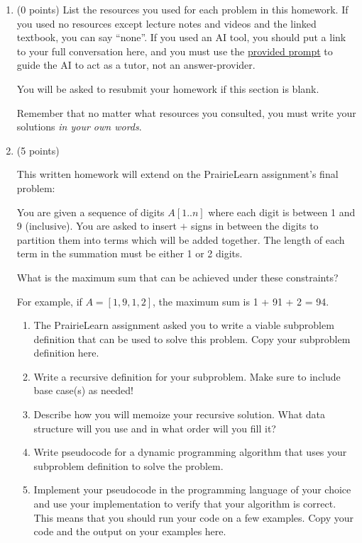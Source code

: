 \documentclass[11pt]{article}
\begin{document}


\begin{enumerate}


\item (0 points) List the resources you used for each problem in this homework. If you used no resources except
lecture notes and videos and the linked textbook, you can say ``none''. If you used
an AI tool, you should put a link to your full conversation here, and you must
use the
\href{https://umaal.org/files/teaching/csci332_fall2026/agents.md}{provided
prompt}
 to guide the AI to act
as a tutor, not an answer-provider.

You will be asked to resubmit your homework if this section is blank.

Remember that no matter what resources you consulted, you must write your solutions
\emph{in your own words}.

\item (5 points)

This written homework will extend on the PrairieLearn assignment's final problem:

You are given a sequence of digits $A[1..n]$ where each digit is between 1 and 9
(inclusive). You are asked to insert $+$ signs in between the digits to partition them
into terms which will be added together. The length of each term in the summation
must be either 1 or 2 digits.

What is the maximum sum that can be achieved under these constraints?

For example, if $A=[1,9,1,2]$, the maximum sum is 1 + 91 + 2 = 94.

\begin{enumerate}

\item  The PrairieLearn assignment asked you to write a viable
subproblem definition that can be used to solve this problem. Copy your
subproblem definition here.

\item  Write a recursive definition for your subproblem. Make sure to
include base case(s) as needed!

\item  Describe how you will memoize your recursive solution. What
data structure will you use and in what order will you fill it?

\item Write pseudocode for a dynamic programming algorithm that
uses your subproblem definition to solve the problem.

\item  Implement your pseudocode in the programming language of your
choice and use your implementation to verify that your algorithm is correct.
This means that you should run your code on a few examples.  Copy your code and
the output on your examples here.

\end{enumerate}
\end{enumerate}
\end{document}
